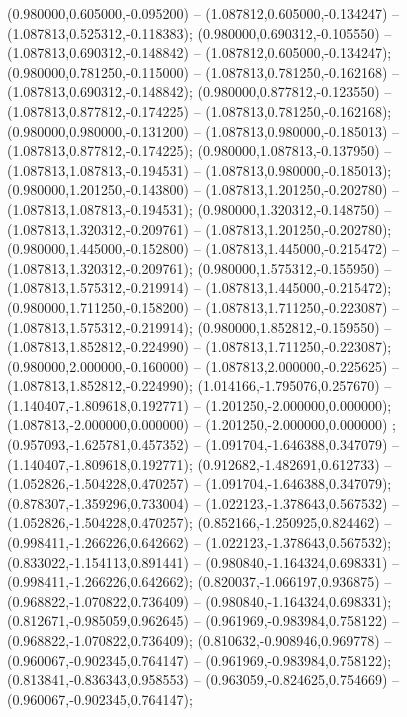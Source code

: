  (0.980000,0.605000,-0.095200) -- (1.087812,0.605000,-0.134247) -- (1.087813,0.525312,-0.118383);
 (0.980000,0.690312,-0.105550) -- (1.087813,0.690312,-0.148842) -- (1.087812,0.605000,-0.134247);
 (0.980000,0.781250,-0.115000) -- (1.087813,0.781250,-0.162168) -- (1.087813,0.690312,-0.148842);
 (0.980000,0.877812,-0.123550) -- (1.087813,0.877812,-0.174225) -- (1.087813,0.781250,-0.162168);
 (0.980000,0.980000,-0.131200) -- (1.087813,0.980000,-0.185013) -- (1.087813,0.877812,-0.174225);
 (0.980000,1.087813,-0.137950) -- (1.087813,1.087813,-0.194531) -- (1.087813,0.980000,-0.185013);
 (0.980000,1.201250,-0.143800) -- (1.087813,1.201250,-0.202780) -- (1.087813,1.087813,-0.194531);
 (0.980000,1.320312,-0.148750) -- (1.087813,1.320312,-0.209761) -- (1.087813,1.201250,-0.202780);
 (0.980000,1.445000,-0.152800) -- (1.087813,1.445000,-0.215472) -- (1.087813,1.320312,-0.209761);
 (0.980000,1.575312,-0.155950) -- (1.087813,1.575312,-0.219914) -- (1.087813,1.445000,-0.215472);
 (0.980000,1.711250,-0.158200) -- (1.087813,1.711250,-0.223087) -- (1.087813,1.575312,-0.219914);
 (0.980000,1.852812,-0.159550) -- (1.087813,1.852812,-0.224990) -- (1.087813,1.711250,-0.223087);
 (0.980000,2.000000,-0.160000) -- (1.087813,2.000000,-0.225625) -- (1.087813,1.852812,-0.224990);
 (1.014166,-1.795076,0.257670) -- (1.140407,-1.809618,0.192771) -- (1.201250,-2.000000,0.000000);
 (1.087813,-2.000000,0.000000) -- (1.201250,-2.000000,0.000000) ;
 (0.957093,-1.625781,0.457352) -- (1.091704,-1.646388,0.347079) -- (1.140407,-1.809618,0.192771);
 (0.912682,-1.482691,0.612733) -- (1.052826,-1.504228,0.470257) -- (1.091704,-1.646388,0.347079);
 (0.878307,-1.359296,0.733004) -- (1.022123,-1.378643,0.567532) -- (1.052826,-1.504228,0.470257);
 (0.852166,-1.250925,0.824462) -- (0.998411,-1.266226,0.642662) -- (1.022123,-1.378643,0.567532);
 (0.833022,-1.154113,0.891441) -- (0.980840,-1.164324,0.698331) -- (0.998411,-1.266226,0.642662);
 (0.820037,-1.066197,0.936875) -- (0.968822,-1.070822,0.736409) -- (0.980840,-1.164324,0.698331);
 (0.812671,-0.985059,0.962645) -- (0.961969,-0.983984,0.758122) -- (0.968822,-1.070822,0.736409);
 (0.810632,-0.908946,0.969778) -- (0.960067,-0.902345,0.764147) -- (0.961969,-0.983984,0.758122);
 (0.813841,-0.836343,0.958553) -- (0.963059,-0.824625,0.754669) -- (0.960067,-0.902345,0.764147);
